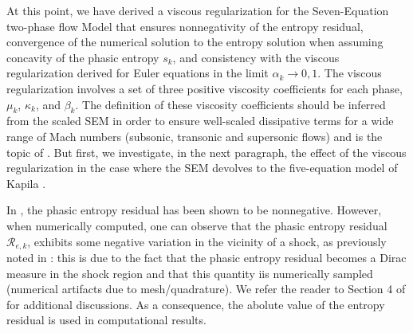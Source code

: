 %
At this point, we have derived a viscous regularization for the Seven-Equation two-phase flow Model that ensures nonnegativity of the 
entropy residual, convergence of the numerical solution to the entropy solution when assuming concavity of the phasic entropy $s_k$, and consistency with 
the viscous regularization derived for Euler equations \cite{jlg_VR_SIAM_2004,Marco_paper_low_mach} in the limit $\alpha_k \to 0,1$. The viscous 
regularization involves a set of three positive viscosity coefficients for each phase, $\mu_k$, $\kappa_k$, and $\beta_k$. The definition 
of these viscosity coefficients should be inferred from the scaled SEM in order to ensure well-scaled dissipative terms for a wide range 
of Mach numbers (subsonic, transonic and supersonic flows) and is the topic of . But first, we investigate, in the 
next paragraph, the effect of the viscous regularization in the case where the SEM devolves to the five-equation model of 
Kapila \cite{Kapila_2001}.
%
\begin{my_remark}\label{rmq:ent_res_neg}
In , the phasic entropy residual has been shown to be nonnegative. However, when numerically computed, one can observe that the phasic entropy residual $\mathcal{R}_{e,k}$,
exhibits some negative variation in the vicinity of a shock, as previously noted  in \cite{Guermond_Pasquetti}: this is due to the fact that the phasic entropy residual becomes a Dirac measure in the shock region and that this quantity iis numerically sampled (numerical
artifacts due to mesh/quadrature). We refer the reader to Section 4 of \cite{Guermond_Pasquetti} for additional discussions. As a consequence, the abolute value of the entropy residual is used in computational results.
\end{my_remark}
%
